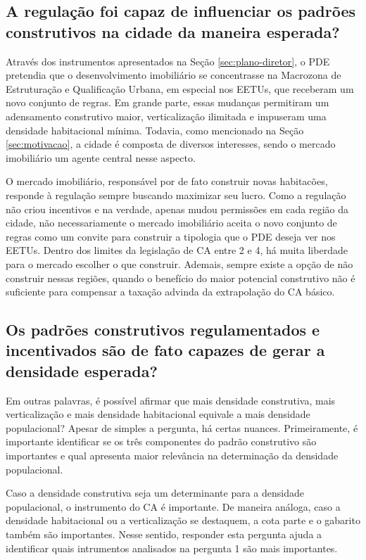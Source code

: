 \subsection*{A regulação foi capaz de influenciar os padrões construtivos na cidade da maneira esperada?} 

Através dos instrumentos apresentados na Seção \ref{sec:plano-diretor}, o PDE pretendia que o desenvolvimento imobiliário se concentrasse na Macrozona de Estruturação e Qualificação Urbana, em especial nos EETUs, que receberam um novo conjunto de regras. Em grande parte, essas mudanças permitiram um adensamento construtivo maior, verticalização ilimitada e impuseram uma densidade habitacional mínima. Todavia, como mencionado na Seção \ref{sec:motivacao}, a cidade é composta de diversos interesses, sendo o mercado imobiliário um agente central nesse aspecto. 

O mercado imobiliário, responsável por de fato construir novas habitacões, responde à regulação sempre buscando maximizar seu lucro. Como a regulação não criou incentivos e na verdade, apenas mudou permissões em cada região da cidade, não necessariamente o mercado imobiliário aceita o novo conjunto de regras como um convite para construir a tipologia que o PDE deseja ver nos EETUs. Dentro dos limites da legislação de CA entre 2 e 4, há muita liberdade para o mercado escolher o que construir. Ademais, sempre existe a opção de não construir nessas regiões, quando o benefício do maior potencial construtivo não é suficiente para compensar a taxação advinda da extrapolação do CA básico. 

\subsection*{Os padrões construtivos regulamentados e incentivados são de fato capazes de gerar a densidade esperada?} 

Em outras palavras, é possível afirmar que mais densidade construtiva, mais verticalização e mais densidade habitacional equivale a mais densidade populacional? Apesar de simples a pergunta, há certas nuances. Primeiramente, é importante identificar se os três componentes do padrão construtivo são importantes e qual apresenta maior relevância na determinação da densidade populacional. 

Caso a densidade construtiva seja um determinante para a densidade populacional, o instrumento do CA é importante. De maneira análoga, caso a densidade habitacional ou a verticalização se destaquem, a cota parte e o gabarito também são importantes. Nesse sentido, responder esta pergunta ajuda a identificar quais intrumentos analisados na pergunta 1 são mais importantes.

